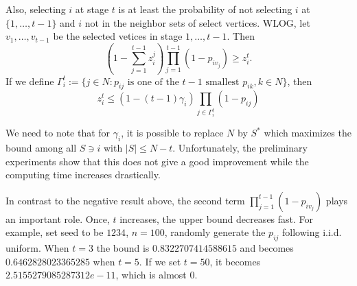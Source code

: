\documentclass[10pt,leqno]{amsart}
\begin{document}
Also, selecting $i$ at stage $t$ is at least the probability of not selecting $i$ at $\{1,\ldots,t-1\}$ and $i$ not in the neighbor sets of select vertices. WLOG, let $v_1,\ldots,v_{t-1}$ be the selected vetices in stage $1,\ldots,t-1$.
Then
\[(1-\sum_{j=1}^{t-1}z_i^j)\prod_{j=1}^{t-1}(1-p_{iv_j})\geq z_{i}^t.\]
If we define $\Gamma_i^t:=\{j\in N: p_{ij}\text{ is one of the $t-1$ smallest }p_{ik},k\in N\}$, then
\[z_i^t\leq (1-(t-1)\gamma_i)\prod_{j\in \Gamma_i^t}(1-p_{ij})\]

We need to note that for $\gamma_i$, it is possible to replace $N$ by $S^*$ which maximizes the bound among all $S\ni i$ with $|S|\leq N-t$. Unfortunately, the preliminary experiments show that this does not give a good improvement while the computing time increases drastically.

In contrast to the negative result above, the second term $\prod_{j=1}^{t-1}(1-p_{iv_j})$ plays an important role.
Once, $t$ increases, the upper bound decreases fast.
For example, set seed to be $1234$, $n=100$, randomly generate the $p_{ij}$ following i.i.d. uniform.
When $t=3$ the bound is $0.8322707414588615$ and becomes $0.6462828023365285$ when $t=5$.
If we set $t=50$, it becomes $2.5155279085287312e-11$, which is almost $0$.
\end{document}
